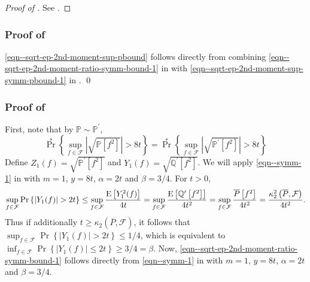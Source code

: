 \begin{proof}[Proof of ]
See .
\end{proof}

\subsubsection{Proof of
\texorpdfstring{}{Lemma
\ref{lem--sqrt-ep-2nd-moment-sup-pbound}}}

\eqref{eqn--sqrt-ep-2nd-moment-sup-pbound} follows directly from combining
\eqref{eqn--sqrt-ep-2nd-moment-ratio-symm-bound-1} in
 with
\eqref{eqn--sqrt-ep-2nd-moment-sup-symm-pbound-1} in
.
\qed

\subsubsection{Proof of
\texorpdfstring{}{Lemma
\ref{lem--sqrt-ep-2nd-moment-ratio-symm-bound-1}}}
\label{sec--prf--lem--sqrt-ep-2nd-moment-ratio-symm-bound-1}

First, note that by \(\mathbb{P} \sim \mathbb{P}^{\prime}\),
\begin{equation*}
  \Pr^{\ast} \left\{ \sup_{f \in \mathcal{F}} \left| \sqrt{\mathbb{P} \left[
  f^{2} \right]} \right| > 8 t \right\} =
  \Pr^{\ast} \left\{ \sup_{f \in \mathcal{F}} \left| \sqrt{\mathbb{P}^{\prime}
  \left[ f^{2} \right]} \right| > 8 t \right\}
\end{equation*}
Define \(Z_{1} (f) = \sqrt{\mathbb{P}^{\prime} \left[ f^{2} \right]}\) and
\(Y_{1} (f) = \sqrt{\mathbb{Q}^{\prime} \left[ f^{2} \right]}\).
We will apply \eqref{eqn--symm-1} in  with \(m = 1\), \(y = 8
t\), \(\alpha = 2 t\) and \(\beta = 3 / 4\).
For \(t > 0\),
\begin{equation*}
  \sup_{f \in \mathcal{F}} \mathrm{Pr} \left\{ \left| Y_{1} (f) \right| > 2 t
  \right\} \leq \sup_{f \in \mathcal{F}} \frac{\mathrm{E} \left[ Y_{1}^{2} (f)
  \right]}{4 t} = \sup_{f \in \mathcal{F}} \frac{\mathrm{E} \left[ \mathbb{Q}^{\prime}
  \left[ f^{2} \right] \right]}{4 t^{2}} = \sup_{f \in \mathcal{F}}
  \frac{\overline{P} \left[ f^{2} \right]}{4 t^{2}} = \frac{\kappa_{2}^{2}
  \left( \overline{P}, \mathcal{F} \right)}{4 t^{2}}.
\end{equation*}
Thus if additionally \(t \geq \kappa_{2} \left( \overline{P}, \mathcal{F}
\right)\), it follows that \(\sup_{f \in \mathcal{F}} \Pr \left\{ \left| Y_{1}
(f) \right| > 2 t \right\} \leq 1 / 4\), which is equivalent to \(\inf_{f \in
\mathcal{F}} \Pr \left\{ \left| Y_{1} (f) \right| \leq 2 t \right\} \geq 3 / 4 =
\beta\).
Now, \eqref{eqn--sqrt-ep-2nd-moment-ratio-symm-bound-1} follows directly from
\eqref{eqn--symm-1} in  with \(m = 1\), \(y = 8
t\), \(\alpha = 2 t\) and \(\beta = 3 / 4\).

